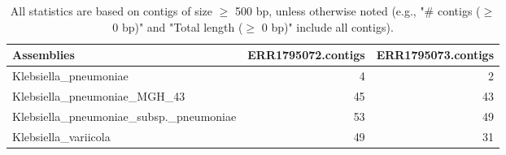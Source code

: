 \documentclass[12pt,a4paper]{article}
\begin{document}
\begin{table}[ht]
\begin{center}
\caption{All statistics are based on contigs of size $\geq$ 500 bp, unless otherwise noted (e.g., "\# contigs ($\geq$ 0 bp)" and "Total length ($\geq$ 0 bp)" include all contigs).}
\begin{tabular}{|l*{2}{|r}|}
\hline
Assemblies & ERR1795072.contigs & ERR1795073.contigs \\ \hline
Klebsiella\_pneumoniae & 4 & 2 \\ \hline
Klebsiella\_pneumoniae\_MGH\_43 & 45 & 43 \\ \hline
Klebsiella\_pneumoniae\_subsp.\_pneumoniae & 53 & 49 \\ \hline
Klebsiella\_variicola & 49 & 31 \\ \hline
\end{tabular}
\end{center}
\end{table}
\end{document}
